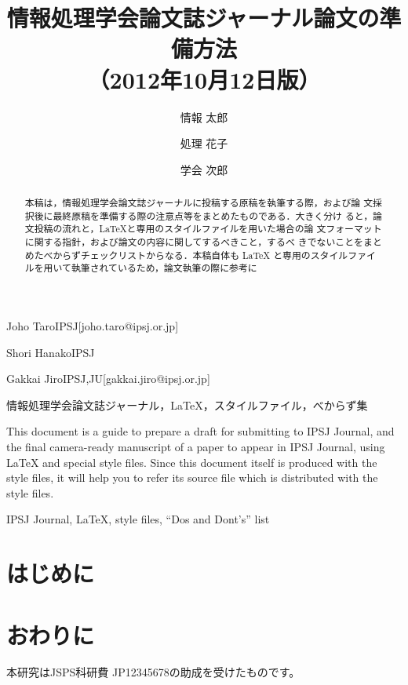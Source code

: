 \documentclass[submit,techrep]{ipsj}
\begin{document}
\title{情報処理学会論文誌ジャーナル論文の準備方法\\（2012年10月12日版）}
\author{情報 太郎}{Joho Taro}{IPSJ}[joho.taro@ipsj.or.jp]
\author{処理 花子}{Shori Hanako}{IPSJ}
\author{学会 次郎}{Gakkai Jiro}{IPSJ,JU}[gakkai.jiro@ipsj.or.jp]
\begin{abstract}
本稿は，情報処理学会論文誌ジャーナルに投稿する原稿を執筆する際，および論
文採択後に最終原稿を準備する際の注意点等をまとめたものである．大きく分け
ると，論文投稿の流れと，\LaTeX と専用のスタイルファイルを用いた場合の論
文フォーマットに関する指針，および論文の内容に関してするべきこと，するべ
きでないことをまとめたべからずチェックリストからなる．本稿自体も \LaTeX
と専用のスタイルファイルを用いて執筆されているため，論文執筆の際に参考に
\end{abstract}
\begin{jkeyword}
情報処理学会論文誌ジャーナル，\LaTeX，スタイルファイル，べからず集
\end{jkeyword}
\begin{eabstract}
This document is a guide to prepare a draft for submitting to IPSJ
Journal, and the final camera-ready manuscript of a paper to appear in
IPSJ Journal, using {\LaTeX} and special style files.  Since this
document itself is produced with the style files, it will help you to
refer its source file which is distributed with the style files.
\end{eabstract}
\begin{ekeyword}
IPSJ Journal, \LaTeX, style files, ``Dos and Dont's'' list
\end{ekeyword}
\maketitle
\section{はじめに}
\cite{latex}
\section{おわりに}
\begin{acknowledgment}
本研究はJSPS科研費 JP12345678の助成を受けたものです。
\end{acknowledgment}


\appendix
\end{document}

